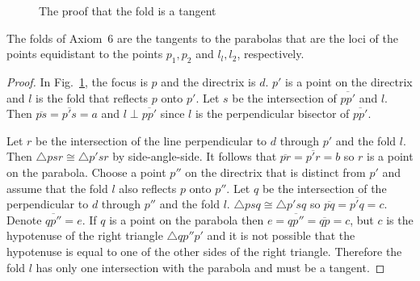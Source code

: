 \newpage

\begin{figure}[thb]
\begin{center}
\end{center}
\caption{The proof that the fold is a tangent}\label{f.tangent-proof}
\end{figure}

\begin{theorem}\label{thm.parabola-tangents}
The folds of Axiom~$6$ are the tangents to the parabolas that are the loci of the points equidistant to the points $p_1,p_2$ and $l_l,l_2$, respectively.
\end{theorem}
\begin{proof}
In Fig.~\ref{f.tangent-proof}, the focus is $p$ and the directrix is $d$. $p'$ is a point on the directrix and $l$ is the fold that reflects $p$ onto $p'$. Let $s$ be the intersection of $\overline{pp'}$ and $l$. Then $\overline{ps}=\overline{p's}=a$ and $l\perp \overline{pp'}$ since $l$ is the perpendicular bisector of $\overline{pp'}$.

Let $r$ be the intersection of the line perpendicular to $d$ through $p'$ and the fold $l$. Then $\triangle psr\cong \triangle p'sr$ by side-angle-side. It follows that 
$\overline{pr}=\overline{p'r}=b$ so $r$ is a point on the parabola. Choose a point $p''$ on the directrix that is distinct from $p'$ and assume that the fold $l$ also reflects $p$ onto $p''$. Let $q$ be the intersection of the perpendicular to $d$ through $p''$ and the fold $l$. $\triangle psq\cong \triangle p'sq$ so $\overline{pq}=\overline{p'q}=c$. Denote $\overline{qp''}=e$. If $q$ is a point on the parabola then $e=\overline{qp''}=\overline{qp}=c$, but $c$ is the hypotenuse of the right triangle $\triangle qp''p'$ and it is not possible that the hypotenuse is equal to one of the other sides of the right triangle. Therefore the fold $l$ has only one intersection with the parabola and must be a tangent.
\end{proof}


